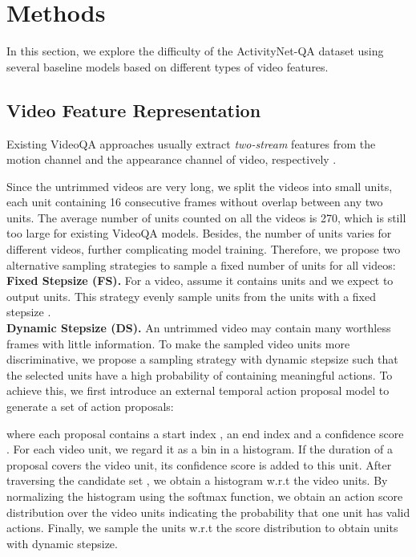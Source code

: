 \documentclass[letterpaper]{article} \usepackage{aaai19}  \usepackage{times}  \usepackage{helvet}  \usepackage{courier}  \usepackage{url}  \usepackage{graphicx}  \usepackage{amsfonts}
\begin{document}
\section{Methods}
In this section, we explore the difficulty of the ActivityNet-QA dataset using several baseline models based on different types of video features.

\subsection{Video Feature Representation}

Existing VideoQA approaches usually extract \emph{two-stream} features from the motion channel and the appearance channel of video, respectively \cite{xu2017video}.

Since the untrimmed videos are very long, we split the videos into small units, each unit containing 16 consecutive frames without overlap between any two units. The average number of units counted on all the videos is 270, which is still too large for existing VideoQA models. Besides, the number of units varies for different videos, further complicating model training. Therefore, we propose two alternative sampling strategies to sample a fixed number of units  for all videos:
\\
\textbf{Fixed Stepsize (FS).} For a video, assume it contains  units and we expect to output  units. This strategy evenly sample  units from the  units with a fixed stepsize .
\\
\textbf{Dynamic Stepsize (DS).} An untrimmed video may contain many worthless frames with little information. To make the sampled video units more discriminative, we propose a sampling strategy with dynamic stepsize such that the selected units have a high probability of containing meaningful actions. To achieve this, we first introduce an external temporal action proposal model \cite{caba2016fast} to generate a set of action proposals:

where each proposal  contains a start index , an end index  and a confidence score . For each video unit, we regard it as a bin in a histogram. If the duration of a proposal  covers the video unit, its confidence score  is added to this unit. After traversing the candidate set , we obtain a histogram w.r.t the video units. By normalizing the histogram using the softmax function, we obtain an action score distribution over the video units indicating the probability that one unit has valid actions. Finally, we sample the units w.r.t the score distribution to obtain  units with dynamic stepsize.
\end{document}
